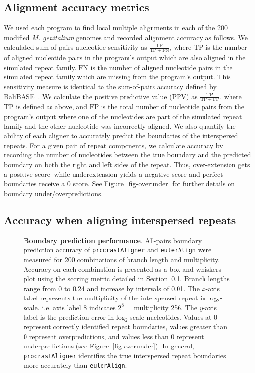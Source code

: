\documentclass[9.5pt,journal,final,finalsubmission,twocolumn]{IEEEtran}
\begin{document}
\subsection{Alignment accuracy metrics}
\label{sec:metrics}
We used each program to find local multiple alignments in each of the
200 modified \emph{M. genitalium} genomes and recorded alignment
accuracy as follows. We calculated sum-of-pairs nucleotide sensitivity
as $\frac{\mathrm{TP}}{\mathrm{TP} + \mathrm{FN}}$, where
$\mathrm{TP}$ is the number of aligned nucleotide pairs in the
program's output which are also aligned in the simulated repeat
family.  $\mathrm{FN}$ is the number of aligned nucleotide pairs in
the simulated repeat family which are missing from the program's
output.  This sensitivity measure is identical to the sum-of-pairs
accuracy defined by BaliBASE~\cite{ref-balibase}.  We calculate the
positive predictive value (PPV) as $\frac{\mathrm{TP}}{\mathrm{TP} +
\mathrm{FP}}$, where $\mathrm{TP}$ is defined as above, and
$\mathrm{FP}$ is the total number of nucleotide pairs from the
program's output where one of the nucleotides are part of the
simulated repeat family and the other nucleotide was incorrectly
aligned. We also quantify the ability of each aligner to accurately predict the
boundaries of the interspersed repeats.  For a given pair of repeat components, we calculate accuracy by recording the number of nucleotides between the true boundary and the predicted boundary
on both the right and left sides of the repeat.  Thus, over-extension gets a positive score, while underextension
yields a negative score and perfect boundaries receive a 0 score. See Figure~\ref{fig-overunder} for
further details on boundary under/overpredictions.


\subsection{Accuracy when aligning interspersed repeats}
\begin{figure}[h!aa]
\centering
{}
\caption[Boundary prediction performance]%
{\textbf{Boundary prediction performance}. All-pairs boundary prediction accuracy of \texttt{procrastAligner} and \texttt{eulerAlign} were measured for 200 combinations of branch length and multiplicity.  Accuracy on each combination is presented as a box-and-whiskers plot using the scoring metric detailed in Section~\ref{sec:metrics}.  Branch lengths range from 0 to 0.24 and increase by intervals of 0.01.  The $x$-axis label represents the multiplicity of the interspersed repeat in log$_2$-scale. i.e. axis label 8 indicates $2^{8}$ = multiplicity 256. The $y$-axis label is the prediction error in log$_2$-scale nucleotides. Values at 0 represent correctly identified repeat boundaries, values greater than 0 represent overpredictions, and values less than 0 represent underpredictions (see Figure~\ref{fig-overunder}). In general, \texttt{procrastAligner} identifies the true interspersed repeat boundaries more accurately than \texttt{eulerAlign}.}
\label{fig-boundary}
\end{figure}
\end{document}
